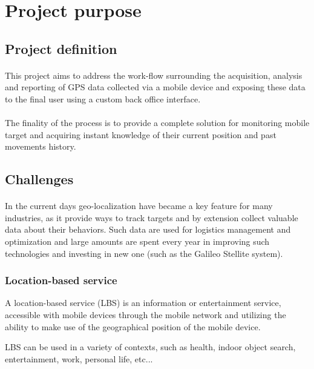 \section{Project purpose}
\subsection{Project definition}
\paragraph{}
This project aims to address the work-flow surrounding the acquisition, analysis and reporting of GPS data collected via a mobile device and exposing these data to the final user using a custom back office interface.

\paragraph{}
The finality of the process is to provide a complete solution for monitoring mobile target and acquiring instant knowledge of their current position and past movements history.

\subsection{Challenges}
\paragraph{}
In the current days geo-localization have became a key feature for many industries, as it provide ways to track targets and by extension collect valuable data about their behaviors. Such data are used for logistics management and optimization and large amounts are spent every year in improving such technologies and investing in new one (such as the Galileo Stellite system).

\subsubsection{Location-based service}
A location-based service (LBS) is an information or entertainment service, accessible with mobile devices through the mobile network and utilizing the ability to make use of the geographical position of the mobile device.

LBS can be used in a variety of contexts, such as health, indoor object search, entertainment, work, personal life, etc...\cite{geolocation:wikipidea:geomarketing}

